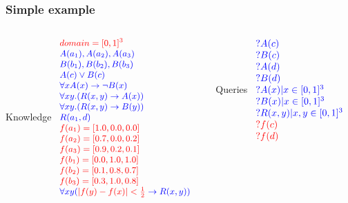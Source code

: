 \documentclass[xcolor=pdftex,dvipsnames,table]{beamer}
\begin{document}
\begin{frame}
  \frametitle{Simple example}
\begin{columns}
  \begin{column}[t]{0.5\textwidth}
    \begin{block}{Knowledge}
      $\small 
      \begin{array}{l}
        \color{red} domain = [0,1]^3 \\
        \color{blue}  A(a_1), A(a_2), A(a_3) \\
        \color{blue}  B(b_1), B(b_2), B(b_3) \\
        \color{blue}  A(c) \vee B(c) \\
        \color{blue} \forall x A(x)\rightarrow \neg B(x) \\
        \color{blue} \forall xy.(R(x,y) \rightarrow A(x)) \\
        \color{blue} \forall xy.(R(x,y) \rightarrow B(y)) \\
        \color{blue} R(a_1,d) \\
        \color{red}f(a_1)  = [1.0,0.0,0.0] \\
        \color{red}f(a_2)  = [0.7,0.0,0.2] \\
        \color{red}f(a_3)  = [0.9,0.2,0.1] \\
        \color{red}f(b_1) = [0.0,1.0,1.0] \\
        \color{red}f(b_2) = [0.1,0.8,0.7]\\
        \color{red}f(b_3) = [0.3,1.0,0.8] \\
        \color{blue}\forall x y ({\color{red} |f(y) - f(x)| <
        \frac{1}{2}} \rightarrow R(x,y))
      \end{array}
      $
    \end{block}
  \end{column}
    \begin{column}[t]{0.45\textwidth}
      \begin{alertblock}{\color{white}Queries}
        $
        \begin{array}{l}
          \color{blue} ? A(c) \\
          \color{blue}? B(c) \\
          \color{blue}? A(d) \\
          \color{blue}? B(d) \\
          \color{blue} ? A(x) | x \in [0,1]^3 \\
          \color{blue} ? B(x) | x \in [0,1]^3 \\
          \color{blue} ? R(x,y) | x,y \in [0,1]^3 \\
          \color{red}? f(c) \\
          \color{red}? f(d) \\
        \end{array}
        $
      \end{alertblock}
    \end{column}
  \end{columns}
\end{frame}  
\end{document}
